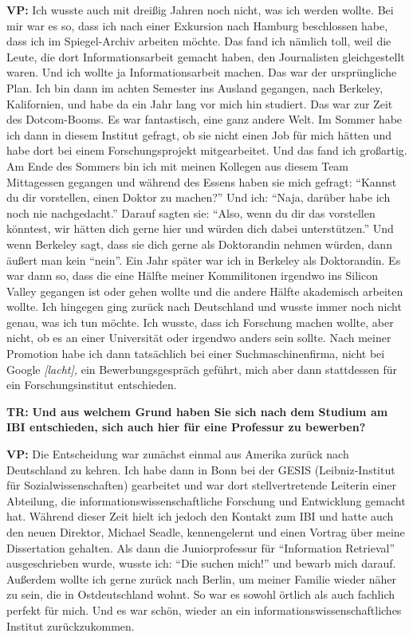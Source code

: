 \documentclass[a4paper,
fontsize=11pt,
oneside,
numbers=noperiodatend,
parskip=half-,
bibliography=totoc,
final
]{scrartcl}
\begin{document}
\textbf{VP:} Ich wusste auch mit dreißig Jahren noch nicht, was ich
werden wollte. Bei mir war es so, dass ich nach einer Exkursion nach
Hamburg beschlossen habe, dass ich im Spiegel-Archiv arbeiten möchte.
Das fand ich nämlich toll, weil die Leute, die dort Informationsarbeit
gemacht haben, den Journalisten gleichgestellt waren. Und ich wollte ja
Informationsarbeit machen. Das war der ursprüngliche Plan. Ich bin dann
im achten Semester ins Ausland gegangen, nach Berkeley, Kalifornien, und
habe da ein Jahr lang vor mich hin studiert. Das war zur Zeit des
Dotcom-Booms. Es war fantastisch, eine ganz andere Welt. Im Sommer habe
ich dann in diesem Institut gefragt, ob sie nicht einen Job für mich
hätten und habe dort bei einem Forschungsprojekt mitgearbeitet. Und das
fand ich großartig. Am Ende des Sommers bin ich mit meinen Kollegen aus
diesem Team Mittagessen gegangen und während des Essens haben sie mich
gefragt: \enquote{Kannst du dir vorstellen, einen Doktor zu machen?} Und
ich: \enquote{Naja, darüber habe ich noch nie nachgedacht.} Darauf
sagten sie: \enquote{Also, wenn du dir das vorstellen könntest, wir
hätten dich gerne hier und würden dich dabei unterstützen.} Und wenn
Berkeley sagt, dass sie dich gerne als Doktorandin nehmen würden, dann
äußert man kein \enquote{nein}. Ein Jahr später war ich in Berkeley als
Doktorandin. Es war dann so, dass die eine Hälfte meiner Kommilitonen
irgendwo ins Silicon Valley gegangen ist oder gehen wollte und die
andere Hälfte akademisch arbeiten wollte. Ich hingegen ging zurück nach
Deutschland und wusste immer noch nicht genau, was ich tun möchte. Ich
wusste, dass ich Forschung machen wollte, aber nicht, ob es an einer
Universität oder irgendwo anders sein sollte. Nach meiner Promotion habe
ich dann tatsächlich bei einer Suchmaschinenfirma, nicht bei Google
\emph{{[}lacht{]},} ein Bewerbungsgespräch geführt, mich aber dann
stattdessen für ein Forschungsinstitut entschieden.

\textbf{TR:} \textbf{Und aus welchem Grund haben Sie sich nach dem
Studium am IBI entschieden, sich auch hier für eine Professur zu
bewerben?}

\textbf{VP:} Die Entscheidung war zunächst einmal aus Amerika zurück
nach Deutschland zu kehren. Ich habe dann in Bonn bei der GESIS
(Leibniz-Institut für Sozialwissenschaften) gearbeitet und war dort
stellvertretende Leiterin einer Abteilung, die
informationswissenschaftliche Forschung und Entwicklung gemacht hat.
Während dieser Zeit hielt ich jedoch den Kontakt zum IBI und hatte auch
den neuen Direktor, Michael Seadle, kennengelernt und einen Vortrag über
meine Dissertation gehalten. Als dann die Juniorprofessur für
\enquote{Information Retrieval} ausgeschrieben wurde, wusste ich:
\enquote{Die suchen mich!} und bewarb mich darauf. Außerdem wollte ich
gerne zurück nach Berlin, um meiner Familie wieder näher zu sein, die in
Ostdeutschland wohnt. So war es sowohl örtlich als auch fachlich perfekt
für mich. Und es war schön, wieder an ein informationswissenschaftliches
Institut zurückzukommen.
\end{document}
